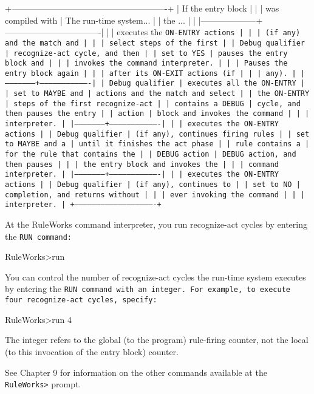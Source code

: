 +-------------------------------------------------------+
| If the entry block |                                  |
| was compiled with  | The run-time system...           |
| the ...            |                                  |
|--------------------+----------------------------------|
|                    | executes the \tt{ON-ENTRY} actions    |
|                    | (if any) and the match and       |
|                    | select steps of the first        |
| Debug qualifier    | recognize-act cycle, and then    |
| set to \tt{YES}         | pauses the entry block and       |
|                    | invokes the command interpreter. |
|                    | Pauses the entry block again     |
|                    | after its ON-EXIT actions (if    |
|                    | any).                            |
|--------------------+----------------------------------|
| Debug qualifier    | executes all the ON-ENTRY        |
| set to \tt{MAYBE} and   | actions and the match and select |
| the \tt{ON-ENTRY}       | steps of the first recognize-act |
| contains a DEBUG   | cycle, and then pauses the entry |
| action             | block and invokes the command    |
|                    | interpreter.                     |
|--------------------+----------------------------------|
|                    | executes the ON-ENTRY actions    |
| Debug qualifier    | (if any), continues firing rules |
| set to MAYBE and a | until it finishes the act phase  |
| rule contains a    | for the rule that contains the   |
| DEBUG action       | DEBUG action, and then pauses    |
|                    | the entry block and invokes the  |
|                    | command interpreter.             |
|--------------------+----------------------------------|
|                    | executes the ON-ENTRY actions    |
| Debug qualifier    | (if any), continues to           |
| set to NO          | completion, and returns without  |
|                    | ever invoking the command        |
|                    | interpreter.                     |
+-------------------------------------------------------+

At the RuleWorks command interpreter, you run recognize-act cycles by
entering the \tt{RUN} command:
\begin{qv}
RuleWorks>run
\end{qv}
You can control the number of recognize-act cycles the run-time system
executes by entering the \tt{RUN} command with an integer. For
example, to execute four recognize-act cycles, specify:
\begin{qv}
RuleWorks>run 4
\end{qv}
The integer refers to the global (to the program) rule-firing counter,
not the local (to this invocation of the entry block) counter.

See Chapter 9 for information on the other commands
available at the \verb|RuleWorks>| prompt.

